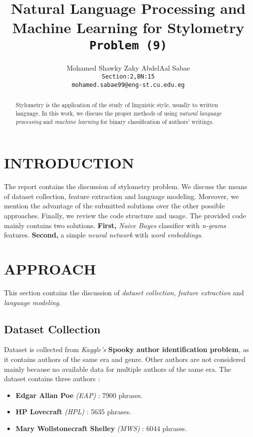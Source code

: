 \documentclass[letterpaper, 10 pt, conference]{ieeeconf}  %
\title{\LARGE \bf
Natural Language Processing and Machine Learning for Stylometry\\
\texttt{Problem (9)}
}
\author{
  Mohamed Shawky Zaky AbdelAal Sabae\\
  \texttt{Section:2,BN:15}\\
  \texttt{mohamed.sabae99@eng-st.cu.edu.eg}
}
\begin{document}
\maketitle
\thispagestyle{empty}
\pagestyle{empty}


\begin{abstract}
Stylometry is the application of the study of linguistic style, usually to written language. In this work, we discuss the proper methods of using \emph{natural language processing} and \emph{machine learning} for binary classification of authors' writings.
\end{abstract}


\section{INTRODUCTION}
The report contains the discussion of stylometry problem. We discuss the means of dataset collection, feature extraction and language modeling. Moreover, we mention the advantage of the submitted solutions over the other possible approaches. Finally, we review the code structure  and usage. The provided code mainly contains two solutions. \textbf{First,} \emph{Naive Bayes} classifier with \emph{n-grams} features. \textbf{Second,} a simple \emph{neural network} with \emph{word embeddings}.


\section{APPROACH}
This section contains the discussion of \emph{dataset collection}, \emph{feature extraction} and \emph{language modeling}.

\subsection{Dataset Collection}
Dataset is collected from \emph{Kaggle's} \textbf{Spooky author identification problem}, as it contains authors of the same era and genre. Other authors are not considered mainly because no available data for multiple authors of the same era. The dataset contains three authors :
\begin{itemize}
    \item \textbf{Edgar Allan Poe} \emph{(EAP)} : 7900 phrases.
    \item \textbf{HP Lovecraft} \emph{(HPL)} : 5635 phrases.
    \item \textbf{Mary Wollstonecraft Shelley} \emph{(MWS)} : 6044 phrases.
\end{itemize}
\end{document}
